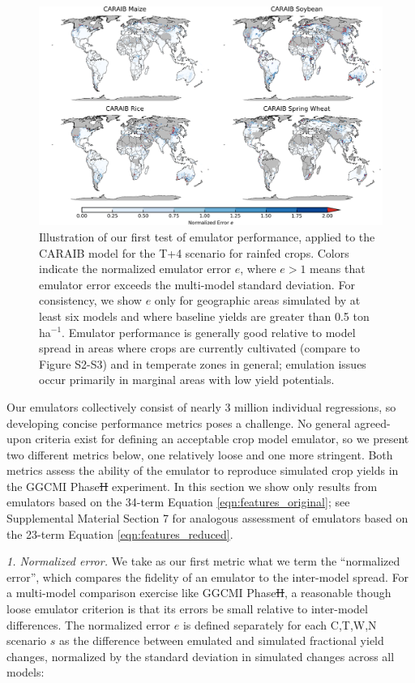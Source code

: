 \documentclass[gmdd]{copernicus} %
\providecommand{\DIFadd}[1]{{\protect\color{blue}\uwave{#1}}} %
\providecommand{\DIFdel}[1]{{\protect\color{red}\sout{#1}}}                      %
\providecommand{\DIFaddbegin}{} %
\providecommand{\DIFaddend}{} %
\providecommand{\DIFdelbegin}{} %
\providecommand{\DIFdelend}{} %
\begin{document}
\begin{figure}[ht]
\centering
    \includegraphics[width=16.3cm]{figures/CARAIB_spatial_error.png}
    \caption{
    Illustration of our first test of emulator performance, applied to the CARAIB model for the T+4 scenario for rainfed crops. 
    Colors indicate the normalized emulator error $e$, where $e > 1$ means that emulator error exceeds the multi-model standard deviation. 
    For consistency, we show $e$ only for geographic areas simulated by at least six models and where baseline yields are greater than 0.5 ton ha$^{-1}$.
    Emulator performance is generally good relative to model spread in areas where crops are currently cultivated (compare to Figure S2-S3) and in temperate zones in general; emulation issues occur primarily in marginal areas with low yield potentials. 
    }
   \label{fig:error}
\end{figure}

Our emulators collectively consist of nearly 3 million individual regressions, so developing concise performance metrics poses a challenge.
No general agreed-upon criteria exist for defining an acceptable crop model emulator, so we present two different metrics below, one relatively loose and one more stringent.  
Both metrics assess the ability of the emulator to reproduce simulated crop yields in the GGCMI Phase\DIFdelbegin \DIFdel{II }\DIFdelend \DIFaddbegin \DIFadd{~2 }\DIFaddend experiment. 
In this section we show only results from emulators based on the 34-term Equation \ref{eqn:features_original};
see Supplemental Material Section 7 for analogous assessment of emulators based on the 23-term Equation \ref{eqn:features_reduced}.

\smallskip
\textit{1. Normalized error.} 
We take as our first metric what we term the ``normalized error'', which compares the fidelity of an emulator to the inter-model spread. 
For a multi-model comparison exercise like GGCMI Phase\DIFdelbegin \DIFdel{II}\DIFdelend \DIFaddbegin \DIFadd{~2}\DIFaddend , a reasonable though loose emulator criterion is that its errors be small relative to inter-model differences. The normalized error $e$ is defined separately for each C,T,W,N scenario $s$ as the difference between emulated and simulated fractional yield changes, normalized by the standard deviation in simulated changes across all models: 
\end{document}
